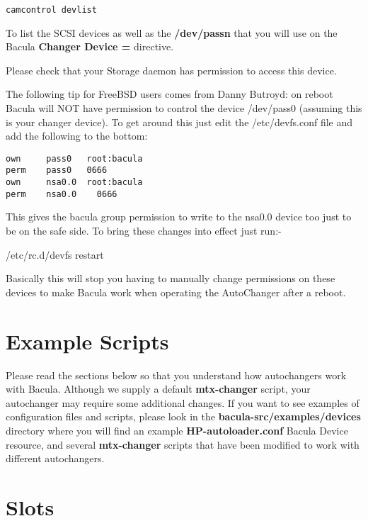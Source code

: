 \footnotesize
\begin{verbatim}
camcontrol devlist
\end{verbatim}
\normalsize

To list the SCSI devices as well as the {\bf /dev/passn} that you will use on
the Bacula {\bf Changer Device = } directive. 

Please check that your Storage daemon has permission to access this
device.

The following tip for FreeBSD users comes from Danny Butroyd:
on reboot Bacula will NOT have permission to 
control the device /dev/pass0 (assuming this is your changer device).  
To get around this just edit the /etc/devfs.conf file and add the 
following to the bottom:                   
\footnotesize
\begin{verbatim}
own     pass0   root:bacula
perm    pass0   0666
own     nsa0.0  root:bacula
perm    nsa0.0    0666
\end{verbatim}
\normalsize

This gives the bacula group permission to write to the nsa0.0 device 
too just to be on the safe side.   To bring these changes into effect 
just run:-

/etc/rc.d/devfs restart

Basically this will stop you having to manually change permissions on these 
devices to make Bacula work when operating the AutoChanger after a reboot.

\label{scripts}
\section{Example Scripts}

Please read the sections below so that you understand how autochangers work
with Bacula. Although we supply a default {\bf mtx-changer} script, your
autochanger may require some additional changes. If you want to see examples
of configuration files and scripts, please look in the {\bf
\lt{}bacula-src\gt{}/examples/devices} directory where you will find an
example {\bf HP-autoloader.conf} Bacula Device resource, and several {\bf
mtx-changer} scripts that have been modified to work with different
autochangers. 

\label{Slots}

\section{Slots}

